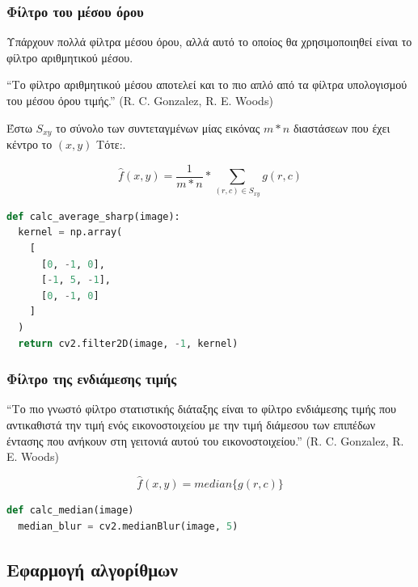 \subsubsection{Φίλτρο του μέσου όρου}

Υπάρχουν πολλά φίλτρα μέσου όρου, αλλά αυτό το οποίος θα χρησιμοποιηθεί είναι το φίλτρο αριθμητικού μέσου.

\begin{problem}
  ``Το φίλτρο αριθμητικού μέσου αποτελεί και το πιο απλό από τα φίλτρα υπολογισμού του μέσου όρου τιμής.''
  (R. C. Gonzalez, R. E. Woods) \par
  Έστω $ S_{xy} $ το σύνολο των συντεταγμένων μίας εικόνας $ m * n $ διαστάσεων που έχει κέντρο το $ (x, y) $ Τότε:.

  \begin{equation}
    \hat{f}(x, y) = \frac{1}{m * n} * \sum_{(r, c) \in S_{xy}} g(r, c)
  \end{equation}
\end{problem}

\begin{lstlisting}[language=Python, caption=Average Sharp]
def calc_average_sharp(image):
  kernel = np.array(
    [
      [0, -1, 0],
      [-1, 5, -1],
      [0, -1, 0]
    ]
  )
  return cv2.filter2D(image, -1, kernel)
\end{lstlisting}

\subsubsection{Φίλτρο της ενδιάμεσης τιμής}

\begin{problem}
  ``Το πιο γνωστό φίλτρο στατιστικής διάταξης είναι το φίλτρο ενδιάμεσης τιμής που αντικαθιστά την τιμή ενός εικονοστοιχείου με την τιμή διάμεσου των επιπέδων έντασης που ανήκουν στη γειτονιά αυτού του εικονοστοιχείου.''
  (R. C. Gonzalez, R. E. Woods)

  \begin{equation}
    \hat{f}(x, y) = median\{g(r, c)\}
  \end{equation}
\end{problem}

\begin{lstlisting}[language=Python, caption=Median Blur]
def calc_median(image)
  median_blur = cv2.medianBlur(image, 5)
\end{lstlisting}

\subsection{Εφαρμογή αλγορίθμων}

